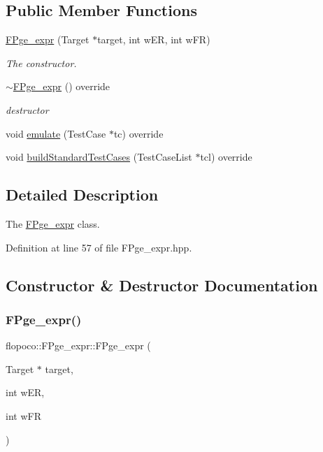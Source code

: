 \subsection*{Public Member Functions}
\begin{DoxyCompactItemize}
\item 
\hyperlink{classflopoco_1_1FPge__expr_aeb2cba7b2022232349633d4083137872}{F\+Pge\+\_\+expr} (Target $\ast$target, int w\+ER, int w\+FR)
\begin{DoxyCompactList}\small\item\em The constructor. \end{DoxyCompactList}\item 
\hyperlink{classflopoco_1_1FPge__expr_a17d026ce2fb239876c9966565a7d8796}{$\sim$\+F\+Pge\+\_\+expr} () override
\begin{DoxyCompactList}\small\item\em destructor \end{DoxyCompactList}\item 
void \hyperlink{classflopoco_1_1FPge__expr_a5c3017a5b30a5ca73565ef827d52ce8c}{emulate} (Test\+Case $\ast$tc) override
\item 
void \hyperlink{classflopoco_1_1FPge__expr_a56c1d6cd2fa14d780206742725b3d8a6}{build\+Standard\+Test\+Cases} (Test\+Case\+List $\ast$tcl) override
\end{DoxyCompactItemize}


\subsection{Detailed Description}
The \hyperlink{classflopoco_1_1FPge__expr}{F\+Pge\+\_\+expr} class. 

Definition at line 57 of file F\+Pge\+\_\+expr.\+hpp.



\subsection{Constructor \& Destructor Documentation}
\mbox{\label{classflopoco_1_1FPge__expr_aeb2cba7b2022232349633d4083137872}} 
\subsubsection{\texorpdfstring{F\+Pge\+\_\+expr()}{FPge\_expr()}}
{\footnotesize\ttfamily flopoco\+::\+F\+Pge\+\_\+expr\+::\+F\+Pge\+\_\+expr (\begin{DoxyParamCaption}\item[{Target $\ast$}]{target,  }\item[{int}]{w\+ER,  }\item[{int}]{w\+FR }\end{DoxyParamCaption})}



